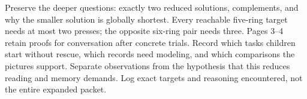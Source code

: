 \documentclass[12pt]{extarticle}
\begin{document}
Preserve the deeper questions: exactly two reduced solutions, complements, and why the smaller solution is globally shortest. Every reachable five-ring target needs at most two presses; the opposite six-ring pair needs three. Pages 3--4 retain proofs for conversation after concrete trials.
Record which tasks children start without rescue, which records need modeling, and which comparisons the pictures support. Separate observations from the hypothesis that this reduces reading and memory demands. Log exact targets and reasoning encountered, not the entire expanded packet.
\end{document}
